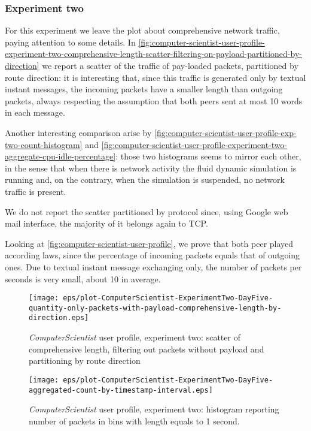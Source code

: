 \documentclass[10pt,a4paper]{article}
\begin{document}
    \subsubsection*{Experiment two}

    For this experiment we leave the plot about comprehensive network
    traffic, paying attention to some details. In
    \autoref{fig:computer-scientist-user-profile-experiment-two-comprehensive-length-scatter-filtering-on-payload-partitioned-by-direction}
    we report a scatter of the traffic of pay-loaded packets,
    partitioned by route direction: it is interesting that, since this
    traffic is generated only by textual instant messages, the
    incoming packets have a smaller length than outgoing packets,
    always respecting the assumption that both peers sent at most 10
    words in each message.

    Another interesting comparison arise by
    \autoref{fig:computer-scientist-user-profile-exp-two-count-histogram}
    and
    \autoref{fig:computer-scientist-user-profile-experiment-two-aggregate-cpu-idle-percentage}:
    those two histograms seems to mirror each other, in the sense that
    when there is network activity the fluid dynamic simulation is
    running and, on the contrary, when the simulation is suspended, no
    network traffic is present.

    We do not report the scatter partitioned by protocol since, using
    Google web mail interface, the majority of it belongs again to
    TCP.

    Looking at \autoref{fig:computer-scientist-user-profile}, we prove
    that both peer played according laws, since the percentage of
    incoming packets equals that of outgoing ones. Due to textual
    instant message exchanging only, the number of packets per seconds
    is very small, about 10 in average.

    \begin{figure}
      \centering
      \texttt{[image: eps/plot-ComputerScientist-ExperimentTwo-DayFive-quantity-only-packets-with-payload-comprehensive-length-by-direction.eps]}
      \caption{\emph{ComputerScientist} user profile, experiment two:
        scatter of comprehensive length, filtering out packets without
        payload and partitioning by route direction}
      \label{fig:computer-scientist-user-profile-experiment-two-comprehensive-length-scatter-filtering-on-payload-partitioned-by-direction}
    \end{figure}

    \begin{figure}
      \centering
      \texttt{[image: eps/plot-ComputerScientist-ExperimentTwo-DayFive-aggregated-count-by-timestamp-interval.eps]}
      \caption{\emph{ComputerScientist} user profile, experiment two: histogram
        reporting number of packets in bins with length equals to 1
        second.}
      \label{fig:computer-scientist-user-profile-exp-two-count-histogram}
    \end{figure}
\end{document}
